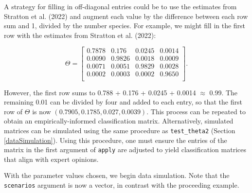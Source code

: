 \documentclass[
]{article}
\begin{document}
A strategy for filling in off-diagonal entries could be to use the estimates from Stratton et al. (2022) and augment each value by the difference between each row sum and 1, divided by the number species. For example, we might fill in the first row with the estimates from Stratton et al. (2022):

\[\Theta = \begin{bmatrix}
  0.7878 & 0.176 & 0.0245 & 0.0014 \\
  0.0090 & 0.9826 & 0.0018 & 0.0009 \\
  0.0071 & 0.0051 & 0.9829 & 0.0028 \\
  0.0002 & 0.0003 & 0.0002 & 0.9650 \\
\end{bmatrix}.\]

However, the first row sums to 0.788 + 0.176 + 0.0245 + 0.0014 \(\approx\) 0.99. The remaining 0.01 can be divided by four and added to each entry, so that the first row of \(\Theta\) is now \((0.7905, 0.1785, 0.027, 0.0039).\) This process can be repeated to obtain an empirically-informed classification matrix. Alternatively, simulated matrices can be simulated using the same procedure as \texttt{test\_theta2} (Section \ref{dataSimulation}). Using this procedure, one must ensure the entries of the matrix in the first argument of \texttt{apply} are adjusted to yield classification matrices that align with expert opinions.

With the parameter values chosen, we begin data simulation. Note that the \texttt{scenarios} argument is now a vector, in contrast with the proceeding example.

\linespread{1}
\end{document}
